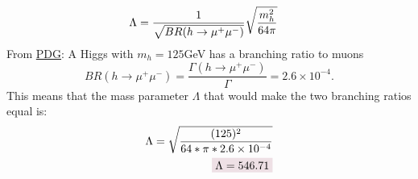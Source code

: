 \documentclass[12 pt,draft]{article}
\begin{document}
\begin{problem}
\begin{align}
			\\
			\Lambda&=\oo{\sqrt{BR(h\rightarrow \mu^+\mu^-)}}\sqrt{\oo[m_h^2]{64\pi}}
		\end{align}
		From \href{https://pdg.lbl.gov/2023/tables/contents_tables.html}{PDG}: A Higgs with $m_h=125$GeV has a branching ratio to muons 
		$$BR(h\rightarrow\mu^+\mu^-)=\frac{\Gamma(h\rightarrow\mu^+\mu^-)}{\Gamma}=2.6\times10^{-4}.$$
		This means that the mass parameter $\Lambda$ that would make the two branching ratios equal is: 
		\begin{align}
			\Lambda=\sqrt{\frac{(125)^2}{64*\pi*2.6\times10^{-4}}}
			\\
			\coloredanswer{\Lambda=546.71}
		\end{align}
	\end{problem}
	\newpage
\end{document}
